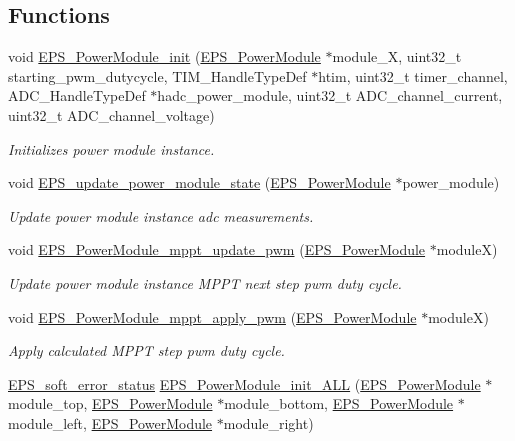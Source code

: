 \subsection*{Functions}
\begin{DoxyCompactItemize}
\item 
void \hyperlink{group__eps__power__module_ga0c3525e3a3eacc3a7dd41944194c919d}{E\-P\-S\-\_\-\-Power\-Module\-\_\-init} (\hyperlink{struct_e_p_s___power_module}{E\-P\-S\-\_\-\-Power\-Module} $\ast$module\-\_\-\-X, uint32\-\_\-t starting\-\_\-pwm\-\_\-dutycycle, T\-I\-M\-\_\-\-Handle\-Type\-Def $\ast$htim, uint32\-\_\-t timer\-\_\-channel, A\-D\-C\-\_\-\-Handle\-Type\-Def $\ast$hadc\-\_\-power\-\_\-module, uint32\-\_\-t A\-D\-C\-\_\-channel\-\_\-current, uint32\-\_\-t A\-D\-C\-\_\-channel\-\_\-voltage)
\begin{DoxyCompactList}\small\item\em Initializes power module instance. \end{DoxyCompactList}\item 
void \hyperlink{group__eps__power__module_gac5d4a4cc33370ab66b87a009674f421a}{E\-P\-S\-\_\-update\-\_\-power\-\_\-module\-\_\-state} (\hyperlink{struct_e_p_s___power_module}{E\-P\-S\-\_\-\-Power\-Module} $\ast$power\-\_\-module)
\begin{DoxyCompactList}\small\item\em Update power module instance adc measurements. \end{DoxyCompactList}\item 
void \hyperlink{group__eps__power__module_gaf492aeceb25b57af9236e98a8c78192c}{E\-P\-S\-\_\-\-Power\-Module\-\_\-mppt\-\_\-update\-\_\-pwm} (\hyperlink{struct_e_p_s___power_module}{E\-P\-S\-\_\-\-Power\-Module} $\ast$module\-X)
\begin{DoxyCompactList}\small\item\em Update power module instance M\-P\-P\-T next step pwm duty cycle. \end{DoxyCompactList}\item 
void \hyperlink{group__eps__power__module_ga197b1a19adb7c60f4cae8b17bc922bab}{E\-P\-S\-\_\-\-Power\-Module\-\_\-mppt\-\_\-apply\-\_\-pwm} (\hyperlink{struct_e_p_s___power_module}{E\-P\-S\-\_\-\-Power\-Module} $\ast$module\-X)
\begin{DoxyCompactList}\small\item\em Apply calculated M\-P\-P\-T step pwm duty cycle. \end{DoxyCompactList}\item 
\hyperlink{group__softerror_ga82875cd4cc1b94ab7e638961c1b79e08}{E\-P\-S\-\_\-soft\-\_\-error\-\_\-status} \hyperlink{group__eps__power__module_ga91f2694f503bf970c7e3139beba5ef77}{E\-P\-S\-\_\-\-Power\-Module\-\_\-init\-\_\-\-A\-L\-L} (\hyperlink{struct_e_p_s___power_module}{E\-P\-S\-\_\-\-Power\-Module} $\ast$module\-\_\-top, \hyperlink{struct_e_p_s___power_module}{E\-P\-S\-\_\-\-Power\-Module} $\ast$module\-\_\-bottom, \hyperlink{struct_e_p_s___power_module}{E\-P\-S\-\_\-\-Power\-Module} $\ast$module\-\_\-left, \hyperlink{struct_e_p_s___power_module}{E\-P\-S\-\_\-\-Power\-Module} $\ast$module\-\_\-right)

\end{DoxyCompactItemize}
